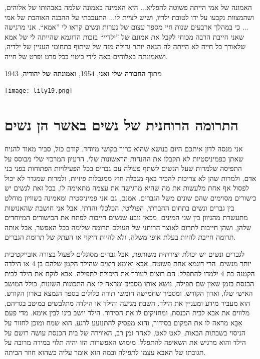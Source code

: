 \documentclass[14pt, article, extrafontsizes, twopage, a4paper]{memoir}
\newcommand{\attr}[1]{
{\raggedright\smaller#1}
}
\begin{document}
האמונה של אמי הייתה פשוטה להפליא... היא האמינה באמונה שלמה באבהותו של אלוהים, ושהמצוות נקבעו על ידו לטובת ילדיו, ושיש לציית לו... התעכבתי על ההבנה האוהבת של אמי ... כי במהלך ארבעים שנות חיי מספר עצום של נערות ונשים קראו לי ”אמא“. אני מרגישה שאני חייבת הרבה מכוחי לקבל את אמונם של ”ילדיי“ בזכות הדוגמא שהייתה לי של אמא שלאורך כל חייה לא הייתה לה הנאה יותר גדולה מזה של שיתוף בתחומי העניין של ילדיה, ושאמונתה באלוהים באה לידי ביטוי בכל פרט ופרט של חייה.

\attr{מתוך \textbf{החבורה שלי ואני}, 1954, ו\textbf{אמונתה של יהודיה}, 1943}

{
  \centering
\vspace*{.5\baselineskip}
\texttt{[image: lily19.png]}\\

}

\chapter{התרומה הרוחנית של נשים באשר הן נשים}

אני מנסה לדון איתכם היום בנושא
שהוא כרוך בקושי מיוחד. קודם כול,
סביר מאוד להניח שאתן כפמיניסטיות לא תקבלו
את ההנחות הראשונות שלי. הרעיון המרכזי שלי מבוסס על התפיסה
שלמרות שעל הנשים לשתף פעולה עם גברים בכל
הפעילויות הפתוחות בפני בני אדם, ולמרות שהן לא צריכות
להכיר באף מגבלה חוץ ממגבלות פיזיות, ולמרות שמגדר
לא יכול לפסול אף אחת מלעשות את מה שהיא
מרגישה את עצמה מתאימה לו, בכל זאת לנשים יש כישורים מסוימים
שהם שונים משל הגברים. אמנם,
גם אני פמיניסטית ומאמינה בשוויון מוחלט בין
גברים ונשים בתחום החברתי, הפוליטי, הכלכלי והדתי,
אבל אני חושבת שהאנושות מתעשרת
מהגיוון בין שני המינים. מכאן נובע שנשים חייבות
לפתח את הכישורים המיוחדים שלהן, ושהן חייבות לתרום
לאוצר הרוחני של העולם תרומה שלימה
ככל האפשר, אבל אותה תרומה חייבת להיות בעלת אופי משלה,
ולא להיות חיקוי או העתק של תרומת הגברים.

לגברים ונשים יש יכולת יצירתית משותפת, אבל
גברים מסוגלים לפעול בצורה אובייקטיבית יותר מנשים. הרי
דוגמא אחת פשוטה. אבא ואימא רוצים שהילד הקטן שלהם
בן 4 או הילדה הקטנה בת 4 ילמדו להתפלל. הם רוצים
לעורר את היכולת לתפילה. אבא לוקח את הילד
לבית הכנסת בזמן שאין שם תפילה, נושא
אותו מסביב ומראה לו את התכונות השונות, כולל המושב האישי שלו,
וארון הקודש, ומסביר שחמישה חומשי תורה
כלולים בספר הנמצא בארון הקודש.
הוא מעביר מידע ומעניין את הילד. השבת
מגיעה והילד או הילדה מתלבשים במיטב בגדיהם,
מלווים את אבא לבית הכנסת, ומחזיקים לו את הסידור.
הילד יושב בינו לבין  אימא.
מדי פעם אַבָּא מראה לו את המקום בסידור, והוא מפסיק
להתנועע לרגע. הוא שמח ומוכן לחזור
על הניסוי בשבתות הבאות. לאט לאט, לאחר
זמן רב, האווירה של בית הכנסת עושה רושם
על הילד והוא מרגיש את השאיפה להתפלל.
מימוש האפשרות הזו יהיה תלוי במידה מרובה
על תגובתו של האבא עצמו לתפילה
ובמה הוא אומר עליה כשהוא חוזר הביתה.
\end{document}

